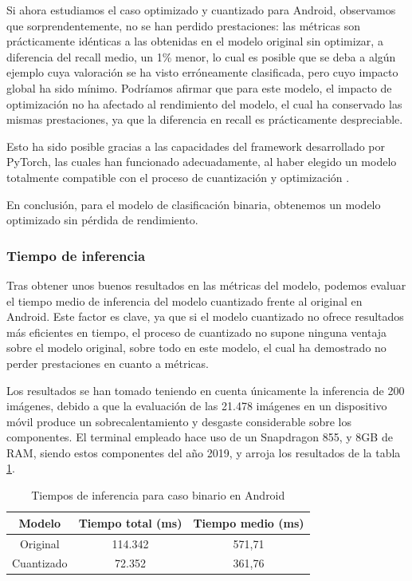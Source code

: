 Si ahora estudiamos el caso optimizado y cuantizado para Android, observamos que sorprendentemente, no se han perdido prestaciones: las métricas son prácticamente idénticas a las obtenidas en el modelo original sin optimizar, a diferencia del recall medio, un 1\% menor, lo cual es posible que se deba a algún ejemplo cuya valoración se ha visto erróneamente clasificada, pero cuyo impacto global ha sido mínimo. Podríamos afirmar que para este modelo, el impacto de optimización no ha afectado al rendimiento del modelo, el cual ha conservado las mismas prestaciones, ya que la diferencia en recall es prácticamente despreciable.

Esto ha sido posible gracias a las capacidades del framework desarrollado por PyTorch, las cuales han funcionado adecuadamente, al haber elegido un modelo totalmente compatible con el proceso de cuantización y optimización \cite{comptquant}.

En conclusión, para el modelo de clasificación binaria, obtenemos un modelo optimizado sin pérdida de rendimiento.

\subsubsection{Tiempo de inferencia}

Tras obtener unos buenos resultados en las métricas del modelo, podemos evaluar el tiempo medio de inferencia del modelo cuantizado frente al original en Android. Este factor es clave, ya que si el modelo cuantizado no ofrece resultados más eficientes en tiempo, el proceso de cuantizado no supone ninguna ventaja sobre el modelo original, sobre todo en este modelo, el cual ha demostrado no perder prestaciones en cuanto a métricas.

Los resultados se han tomado teniendo en cuenta únicamente la inferencia de 200 imágenes, debido a que la evaluación de las 21.478 imágenes en un dispositivo móvil produce un sobrecalentamiento y desgaste considerable sobre los componentes. El terminal empleado hace uso de un Snapdragon 855, y 8GB de RAM, siendo estos componentes del año 2019, y arroja los resultados de la tabla \ref{infbintmp}.

\begin{table}[H]
	\centering
	\begin{tabular}{|c|c|c|}
		\hline
		Modelo & Tiempo total (ms) & Tiempo medio (ms) \\ \hline
		Original & 114.342 & 571,71 \\ \hline
		Cuantizado & 72.352 & 361,76 \\ \hline
	\end{tabular}
	\caption{Tiempos de inferencia para caso binario en Android}
	\label{infbintmp}
\end{table}

